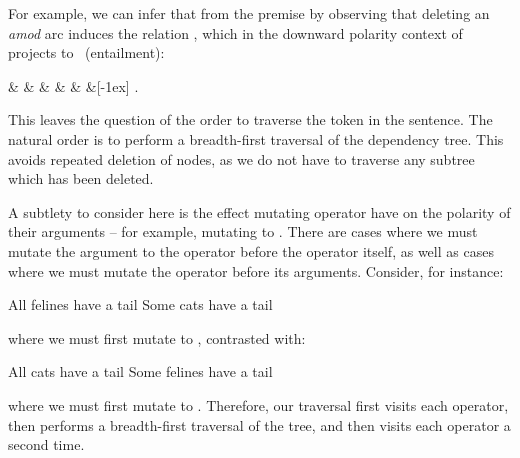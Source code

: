 For example, we can infer that 
   from the premise
   by observing that deleting
  an \textit{amod} arc induces the relation \reverse, which in the downward
  polarity context of \textit{} projects to \forward\ (entailment):

\begin{center}
\begin{dependency}[text only label, label style={above}]
  \begin{deptext}[column sep=-0.00cm]
     \&  \&  \& 
       \&  \&  \&[-1ex] .\\
  \end{deptext}
\end{dependency}
\end{center}

This leaves the question of the order to traverse the token in the sentence.
The natural order is to perform a breadth-first traversal of the dependency tree.
This avoids repeated deletion of nodes, as we do not have to traverse any
  subtree which has been deleted.

A subtlety to consider here is the effect mutating operator have on the
  polarity of their arguments -- for example, mutating  to
  .
There are cases where we must mutate the argument to the operator before
  the operator itself, as well as cases where we must mutate the operator
  before its arguments.
Consider, for instance:

\entailmentExample
{All felines have a tail}
{Some cats have a tail}

\noindent where we must first mutate  to , contrasted with:

\entailmentExample
{All cats have a tail}
{Some felines have a tail}

\noindent where we must first mutate  to .
Therefore, our traversal first visits each operator, then performs a breadth-first
  traversal of the tree, and then visits each operator a second time.

